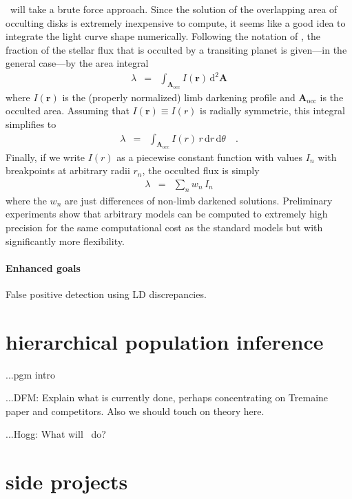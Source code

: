 \documentclass[letterpaper,12pt,preprint]{hack_aastex}
\newcommand{\Bart}{\package{Bart}}
\newcommand{\TheCreator}{\package{TheCreator}}
\newcommand{\dd}{\,\mathrm{d}}
\newcommand{\bvec}[1]{\mathbf{#1}}
\begin{document}
\Bart\ will take a brute force approach.
Since the solution of the overlapping area of occulting disks is extremely
inexpensive to compute, it seems like a good idea to integrate the light curve
shape numerically.
Following the notation of \citet{mandel}, the fraction of the stellar flux
that is occulted by a transiting planet is given---in the general case---by
the area integral
\begin{eqnarray}
\lambda & = & \int_{\bvec{A}_\mathrm{occ}} I(\bvec{r}) \dd^2 \bvec{A}
\end{eqnarray}
where $I(\bvec{r})$ is the (properly normalized) limb darkening profile and
$\bvec{A}_\mathrm{occ}$ is the occulted area.
Assuming that $I(\bvec{r}) \equiv I(r)$ is radially symmetric, this integral
simplifies to
\begin{eqnarray}
\lambda & = & \int_{\bvec{A}_\mathrm{occ}} I(r) \, r \dd r \dd \theta \quad.
\end{eqnarray}
Finally, if we write $I(r)$ as a piecewise constant function with values $I_n$
with breakpoints at arbitrary radii $r_n$, the occulted flux is simply
\begin{eqnarray}
\lambda & = & \sum_n w_n \, I_n
\end{eqnarray}
where the $w_n$ are just differences of non-limb darkened solutions.
Preliminary experiments show that arbitrary models can be computed to
extremely high precision for the same computational cost as the standard
\citet{mandel} models but with significantly more flexibility.


\paragraph{Enhanced goals}
False positive detection using LD discrepancies.


\section{hierarchical population inference}

...pgm intro

...DFM:  Explain what is currently done, perhaps concentrating on Tremaine
paper and competitors.  Also we should touch on theory here.

...Hogg:  What will \TheCreator\ do?

\section{side projects}
\end{document}
